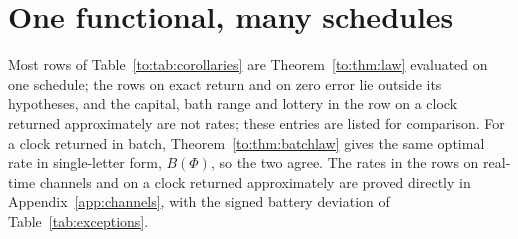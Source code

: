 \section{One functional, many schedules}\label{to:sec:table}

Most rows of Table~\ref{to:tab:corollaries} are Theorem~\ref{to:thm:law} evaluated on one schedule; the rows on exact return and on zero error lie outside its hypotheses, and the capital, bath range and lottery in the row on a clock returned approximately are not rates; these entries are listed for comparison. For a clock returned in batch, Theorem~\ref{to:thm:batchlaw} gives the same optimal rate in single-letter form, $B(\Phi)$, so the two agree. The rates in the rows on real-time channels and on a clock returned approximately are proved directly in Appendix~\ref{app:channels}, with the signed battery deviation of Table~\ref{tab:exceptions}.


